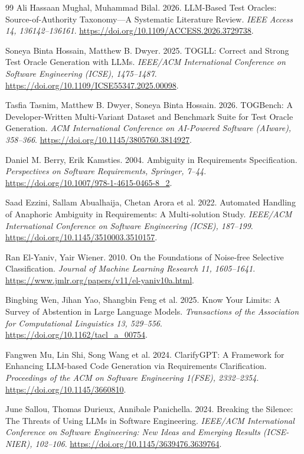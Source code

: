 \documentclass[sigconf,nonacm]{acmart}
\begin{document}
\begin{thebibliography}{99}
 Ali Hassaan Mughal, Muhammad Bilal. 2026. LLM-Based Test Oracles: Source-of-Authority Taxonomy---A Systematic Literature Review. \emph{IEEE Access 14, 136142--136161}. \url{https://doi.org/10.1109/ACCESS.2026.3729738}.

 Soneya Binta Hossain, Matthew B. Dwyer. 2025. TOGLL: Correct and Strong Test Oracle Generation with LLMs. \emph{IEEE/ACM International Conference on Software Engineering (ICSE), 1475--1487}. \url{https://doi.org/10.1109/ICSE55347.2025.00098}.

 Tasfia Tasnim, Matthew B. Dwyer, Soneya Binta Hossain. 2026. TOGBench: A Developer-Written Multi-Variant Dataset and Benchmark Suite for Test Oracle Generation. \emph{ACM International Conference on AI-Powered Software (AIware), 358--366}. \url{https://doi.org/10.1145/3805760.3814927}.

 Daniel M. Berry, Erik Kamsties. 2004. Ambiguity in Requirements Specification. \emph{Perspectives on Software Requirements, Springer, 7--44}. \url{https://doi.org/10.1007/978-1-4615-0465-8_2}.

 Saad Ezzini, Sallam Abualhaija, Chetan Arora et al. 2022. Automated Handling of Anaphoric Ambiguity in Requirements: A Multi-solution Study. \emph{IEEE/ACM International Conference on Software Engineering (ICSE), 187--199}. \url{https://doi.org/10.1145/3510003.3510157}.

 Ran El-Yaniv, Yair Wiener. 2010. On the Foundations of Noise-free Selective Classification. \emph{Journal of Machine Learning Research 11, 1605--1641}. \url{https://www.jmlr.org/papers/v11/el-yaniv10a.html}.

 Bingbing Wen, Jihan Yao, Shangbin Feng et al. 2025. Know Your Limits: A Survey of Abstention in Large Language Models. \emph{Transactions of the Association for Computational Linguistics 13, 529--556}. \url{https://doi.org/10.1162/tacl_a_00754}.

 Fangwen Mu, Lin Shi, Song Wang et al. 2024. ClarifyGPT: A Framework for Enhancing LLM-based Code Generation via Requirements Clarification. \emph{Proceedings of the ACM on Software Engineering 1(FSE), 2332--2354}. \url{https://doi.org/10.1145/3660810}.

 June Sallou, Thomas Durieux, Annibale Panichella. 2024. Breaking the Silence: The Threats of Using LLMs in Software Engineering. \emph{IEEE/ACM International Conference on Software Engineering: New Ideas and Emerging Results (ICSE-NIER), 102--106}. \url{https://doi.org/10.1145/3639476.3639764}.


\end{thebibliography}
\end{document}
